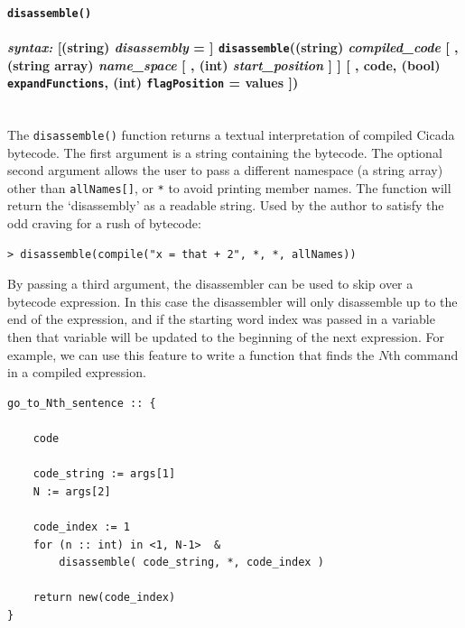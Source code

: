 \documentclass{article}
\newenvironment{code}{
       \begin{list}{}{
               \setlength{\leftmargin}{.4in}
               \setlength{\rightmargin}{0in}
               \setlength{\topsep}{.2in}
       }
       \small
       \item[] }
       { \end{list}   }
\begin{document}
\paragraph{\texttt{disassemble()}\\\\  
\normalfont \emph{syntax: } [(string) \emph{disassembly} = ] \texttt{disassemble}((string) \emph{compiled\_code} [ , (string array) \emph{name\_space} [ , (int) \emph{start\_position} ] ] [ , code, (bool) \texttt{expandFunctions}, (int) \texttt{flagPosition} = values ])\\\\}

The \texttt{disassemble()} function returns a textual interpretation of compiled Cicada bytecode.  The first argument is a string containing the bytecode.  The optional second argument allows the user to pass a different namespace (a string array) other than \verb#allNames[]#, or \verb#*# to avoid printing member names.  The function will return the `disassembly' as a readable string.  Used by the author to satisfy the odd craving for a rush of bytecode:

\begin{code} \begin{verbatim}
> disassemble(compile("x = that + 2", *, *, allNames))
\end{verbatim} \end{code}

By passing a third argument, the disassembler can be used to skip over a bytecode expression.  In this case the disassembler will only disassemble up to the end of the expression, and if the starting word index was passed in a variable then that variable will be updated to the beginning of the next expression.  For example, we can use this feature to write a function that finds the $N$th command in a compiled expression.

\begin{code} \begin{verbatim}
go_to_Nth_sentence :: {
    
    code
    
    code_string := args[1]
    N := args[2]
    
    code_index := 1
    for (n :: int) in <1, N-1>  &
        disassemble( code_string, *, code_index )
    
    return new(code_index)
}
\end{verbatim} \end{code}
\end{document}
